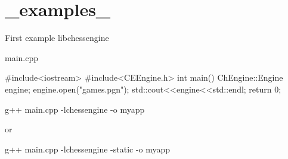 \hypertarget{_examples_-example}{
\section{\_\-examples\_\-}
}
First example libchessengine


\begin{DoxyCode}
 main.cpp

#include<iostream>
#include<CEEngine.h>
int main()
{
    ChEngine::Engine engine;
    engine.open("games.pgn");
    std::cout<<engine<<std::endl;
    return 0;
}
\end{DoxyCode}


g++ main.cpp -\/lchessengine -\/o myapp

or

g++ main.cpp -\/lchessengine -\/static -\/o myapp


\begin{DoxyCodeInclude}
\end{DoxyCodeInclude}
 